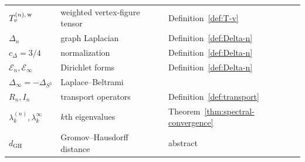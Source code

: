 \documentclass[11pt, a4paper]{amsart}
\theoremstyle{definition}
\newcommand{\dGH}{d_{\mathrm{GH}}}
\begin{document}
\begin{center}
\begin{tabular}{|l|l|l|}
$T_v^{(n),\,\rm w}$ & weighted vertex-figure tensor &
  Definition~\ref{def:T-v} \\
$\Delta_n$ & graph Laplacian &
  Definition~\ref{def:Delta-n} \\
$c_\Delta = 3/4$ & normalization &
  Definition~\ref{def:Delta-n} \\
$\mathcal E_n, \mathcal E_\infty$ & Dirichlet forms &
  Definition~\ref{def:Delta-n} \\
$\Delta_\infty = -\Delta_{S^3}$ & Laplace--Beltrami & \\
$R_n, I_n$ & transport operators &
  Definition~\ref{def:transport} \\
$\lambda_k^{(n)}, \lambda_k^\infty$ & $k$th eigenvalues &
  Theorem~\ref{thm:spectral-convergence} \\
$\dGH$ & Gromov--Hausdorff distance & abstract \\
\hline
\end{tabular}
\end{center}
\end{document}
